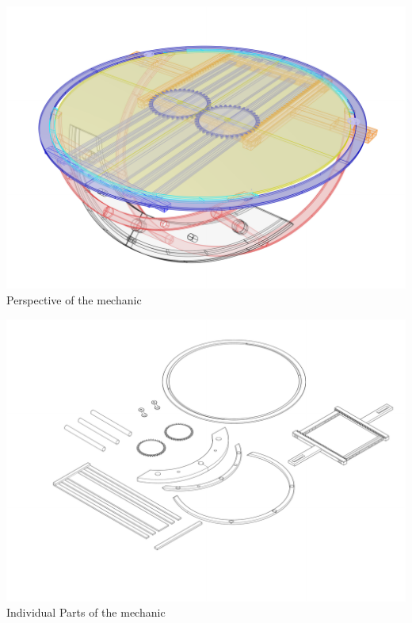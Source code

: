 \documentclass[a4paper,9pt]{article}
\begin{document}
     \begin{minipage}{0.48\linewidth}
        \centering
        \includegraphics[width=.85\linewidth]{Images/ring prototype_v2 total.pdf}
       \\{Perspective of the mechanic}
       
    \end{minipage}
    \hfill
    \begin{minipage}{0.48\linewidth}
         \centering
        \includegraphics[width=.85\linewidth]{Images/ring prototype_v2 disect.pdf}
       \\{Individual Parts of the mechanic}
     
    \end{minipage}
    \label{caddd}

\newpage
\end{document}
